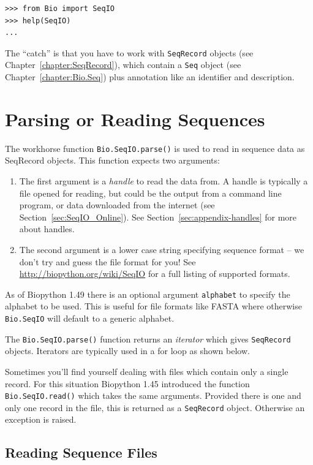 \documentclass{report}
\begin{document}
\begin{verbatim}
>>> from Bio import SeqIO
>>> help(SeqIO)
...
\end{verbatim}

The ``catch'' is that you have to work with \verb|SeqRecord| objects (see Chapter~\ref{chapter:SeqRecord}), which contain a \verb|Seq| object (see Chapter~\ref{chapter:Bio.Seq}) plus annotation like an identifier and description.

\section{Parsing or Reading Sequences}
\label{sec:Bio.SeqIO-input}

The workhorse function \verb|Bio.SeqIO.parse()| is used to read in sequence data as SeqRecord objects.  This function expects two arguments:

\begin{enumerate}
\item The first argument is a {\it handle} to read the data from. A handle is typically a file opened for reading, but could be the output from a command line program, or data downloaded from the internet (see Section~\ref{sec:SeqIO_Online}).  See Section~\ref{sec:appendix-handles} for more about handles.
\item The second argument is a lower case string specifying sequence format -- we don't try and guess the file format for you!  See \url{http://biopython.org/wiki/SeqIO} for a full listing of supported formats.
\end{enumerate}

\noindent As of Biopython 1.49 there is an optional argument \verb|alphabet| to specify the alphabet to be used.  This is useful for file formats like FASTA where otherwise \verb|Bio.SeqIO| will default to a generic alphabet.

The \verb|Bio.SeqIO.parse()| function returns an {\it iterator} which gives \verb|SeqRecord| objects.  Iterators are typically used in a for loop as shown below.

Sometimes you'll find yourself dealing with files which contain only a single record.  For this situation Biopython 1.45 introduced the function \verb|Bio.SeqIO.read()| which takes the same arguments.  Provided there is one and only one record in the file, this is returned as a \verb|SeqRecord| object.  Otherwise an exception is raised.

\subsection{Reading Sequence Files}
\end{document}
